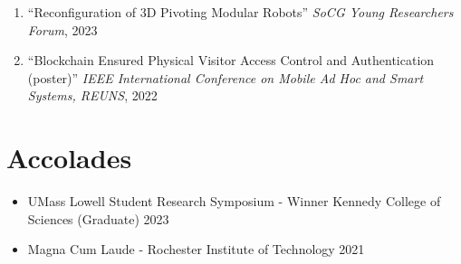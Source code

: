 \documentclass[letterpaper,11pt]{article}
\makeatletter
\newcommand{\resumeSubHeadingListStart}{\begin{itemize}[leftmargin=*]}
\newcommand{\resumeSubHeadingListEnd}{\end{itemize}}
\newcommand{\resumeSubheading}[4]{%
  \item[]%
  \begin{tabularx}{\textwidth}{>{\raggedright\arraybackslash}X@{\hspace{0.5em}}r}
    {\bfseries{\textsc{#1}}} & #2 \\[2pt]
    {\small #3}               & {\small #4} \\
  \end{tabularx}%
}
\newcommand{\presentation}[3]{
  \item ``#1'' %
     \emph{#2}, %
      #3%


}
\newcommand{\resumeOneLine}[2]{%
  \item[] #1 #2
}
\newcommand{\pdficon}{\faFilePdf}
\makeatother
\begin{document}
\begin{enumerate}
  \presentation{Reconfiguration of 3D Pivoting Modular Robots}{SoCG Young Researchers Forum}{2023} \vspace{-.5em}  
  \presentation{Blockchain Ensured Physical Visitor Access Control and Authentication (poster)}{IEEE International Conference on Mobile Ad Hoc and Smart Systems, REUNS}{2022} 
\end{enumerate}

\section{Accolades}
\resumeSubHeadingListStart
  \resumeOneLine{UMass Lowell Student Research Symposium - Winner Kennedy College of Sciences (Graduate)}{2023}
  \resumeOneLine{Magna Cum Laude -  Rochester Institute of Technology}{2021}
\resumeSubHeadingListEnd
\end{document}

